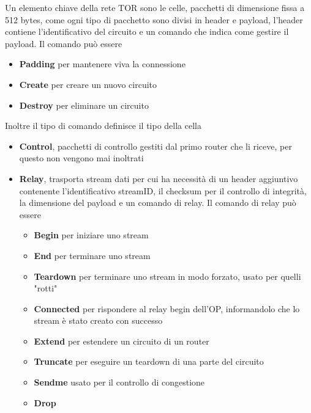 Un elemento chiave della rete TOR sono le celle, pacchetti di dimensione fissa a 512 bytes, come ogni tipo di pacchetto sono divisi in header e payload, l'header contiene l'identificativo del circuito e un comando che indica come gestire il payload. Il comando può essere
\begin{itemize}
    \item \textbf{Padding} per mantenere viva la connessione
    \item \textbf{Create} per creare un nuovo circuito
    \item \textbf{Destroy} per eliminare un circuito
\end{itemize}
Inoltre il tipo di comando definisce il tipo della cella
\begin{itemize}
    \item \textbf{Control}, pacchetti di controllo gestiti dal primo router che li riceve, per questo non vengono mai inoltrati
    \item \textbf{Relay}, trasporta stream dati per cui ha necessità di un header aggiuntivo contenente l'identificativo streamID, il checksum per il controllo di integrità, la dimensione del payload e un comando di relay. Il comando di relay può essere 
    \begin{itemize}
        \item \textbf{Begin} per iniziare uno stream
        \item \textbf{End} per terminare uno stream
        \item \textbf{Teardown} per terminare uno stream in modo forzato, usato per quelli "rotti"
        \item \textbf{Connected} per rispondere al relay begin dell'OP, informandolo che lo stream è stato creato con successo
        \item \textbf{Extend} per estendere un circuito di un router 
        \item \textbf{Truncate} per eseguire un teardown di una parte del circuito
        \item \textbf{Sendme} usato per il controllo di congestione
        \item \textbf{Drop} 
    \end{itemize}
\end{itemize}

